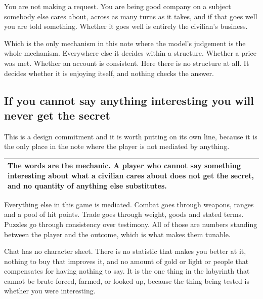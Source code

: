 \documentclass[11pt,a4paper]{article}
\begin{document}
You are not making a request. You are being good company on a subject somebody else cares about,
across as many turns as it takes, and if that goes well you are told something. Whether it goes
well is entirely the civilian's business.

\begin{sectionbox}
Which is the only mechanism in this note where the model's judgement is the whole mechanism.
Everywhere else it decides within a structure. Whether a price was met. Whether an account is
consistent. Here there is no structure at all. It decides whether it is enjoying itself, and
nothing checks the answer.
\end{sectionbox}

\subsection{If you cannot say anything interesting you will never get the secret}

This is a design commitment and it is worth putting on its own line, because it is the only place
in the note where the player is not mediated by anything.

\begin{center}
\begin{tabular}{@{}>{\raggedright\arraybackslash}p{}@{}}
\toprule
\textbf{The words are the mechanic. A player who cannot say something interesting about what a
civilian cares about does not get the secret, and no quantity of anything else substitutes.} \\
\bottomrule
\end{tabular}
\end{center}

Everything else in this game is mediated. Combat goes through weapons, ranges and a pool of hit
points. Trade goes through weight, goods and stated terms. Puzzles go through consistency over
testimony. All of those are numbers standing between the player and the outcome, which is what
makes them tunable.

\begin{sectionbox}
Chat has no character sheet. There is no statistic that makes you better at it, nothing to buy that
improves it, and no amount of gold or light or people that compensates for having nothing to say.
It is the one thing in the labyrinth that cannot be brute-forced, farmed, or looked up, because the
thing being tested is whether you were interesting.
\end{sectionbox}
\end{document}
